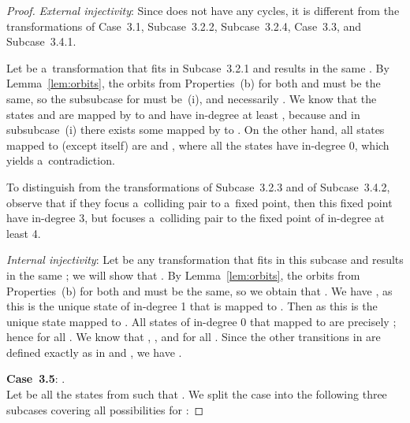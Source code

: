 \documentclass{amsart}
\begin{document}
\begin{proof}
\textit{External injectivity}:
Since  does not have any cycles, it is different from the transformations of Case~3.1, Subcase~3.2.2, Subcase~3.2.4, Case~3.3, and Subcase~3.4.1.

Let  be a~transformation that fits in Subcase~3.2.1 and results in the same .
By Lemma~\ref{lem:orbits}, the orbits from Properties~(b) for both  and  must be the same, so the subsubcase for  must be~(i), and necessarily .
We know that the states  and  are mapped by  to  and have in-degree at least , because  and in subsubcase~(i) there exists some  mapped by  to .
On the other hand, all states mapped to  (except  itself) are  and , where all the states  have in-degree 0, which yields a~contradiction.

To distinguish  from the transformations of Subcase~3.2.3 and of Subcase~3.4.2, observe that if they focus a~colliding pair to a~fixed point, then this fixed point have in-degree 3, but  focuses a~colliding pair to the fixed point  of in-degree at least 4.

\textit{Internal injectivity}:
Let  be any transformation that fits in this subcase and results in the same ; we will show that .
By Lemma~\ref{lem:orbits}, the orbits from Properties~(b) for both  and  must be the same, so we obtain that .
We have , as this is the unique state of in-degree 1 that is mapped to .
Then  as this is the unique state mapped to .
All states of in-degree 0 that mapped to  are precisely ; hence  for all .
We know that , , and  for all .
Since the other transitions in  are defined exactly as in  and , we have .

\textbf{Case~3.5}: .\\
Let  be all the states from  such that .
We split the case into the following three subcases covering all possibilities for :


\end{proof}
\end{document}
